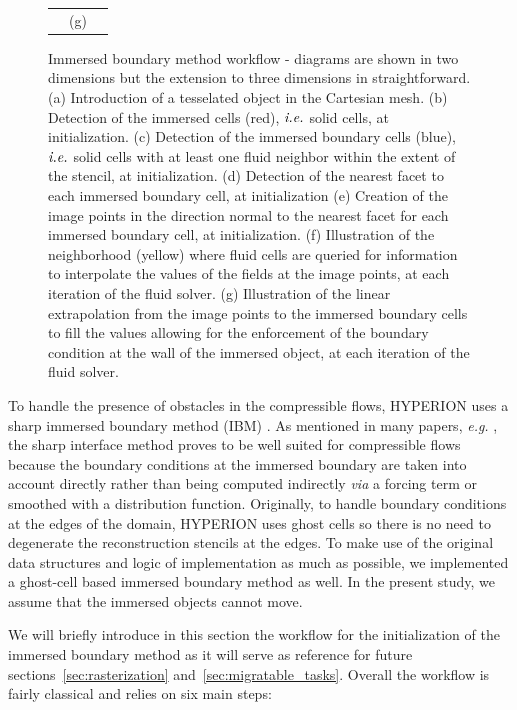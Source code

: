 \begin{figure}[ht!]
\begin{tabular}{ccc}
        & (g) &
    \end{tabular}
    \caption{Immersed boundary method workflow - diagrams are shown in two dimensions but the extension to three dimensions in straightforward.
    (a) Introduction of a tesselated object in the Cartesian mesh.
    (b) Detection of the immersed cells (red), $\emph{i.e.}$ solid cells, at initialization.
    (c) Detection of the immersed boundary cells (blue), $\emph{i.e.}$ solid cells with at least one fluid neighbor within the extent of the stencil, at initialization.
    (d) Detection of the nearest facet to each immersed boundary cell, at initialization
    (e) Creation of the image points in the direction normal to the nearest facet for each immersed boundary cell, at initialization.
    (f) Illustration of the neighborhood (yellow) where fluid cells are queried for information to interpolate the values of the fields at the image points, at each iteration of the fluid solver.
    (g) Illustration of the linear extrapolation from the image points to the immersed boundary cells to fill the values allowing for the enforcement of the boundary condition at the wall of the immersed object, at each iteration of the fluid solver.}
    \label{fig:ibm_workflow}
\end{figure}

To handle the presence of obstacles in the compressible flows, HYPERION uses a sharp immersed boundary method (IBM) \cite{mittal2005immersed}.
As mentioned in many papers, \emph{e.g.} \cite{khalili2019,qu2018}, the sharp interface method proves to be well suited for compressible flows because the boundary conditions at the immersed boundary are taken into account directly rather than being computed indirectly \emph{via} a forcing term or smoothed with a distribution function.
Originally, to handle boundary conditions at the edges of the domain, HYPERION uses ghost cells so there is no need to degenerate the reconstruction stencils at the edges.
To make use of the original data structures and logic of implementation as much as possible, we implemented a ghost-cell based immersed boundary method as well.
In the present study, we assume that the immersed objects cannot move.

We will briefly introduce in this section the workflow for the initialization of the immersed boundary method as it will serve as reference for future sections~\ref{sec:rasterization} and~\ref{sec:migratable_tasks}.
Overall the workflow is fairly classical \cite{mittal2005immersed,chi2017improved,khalili2019,qu2018,yousefzadeh2019,zhang2019} and relies on six main steps:

